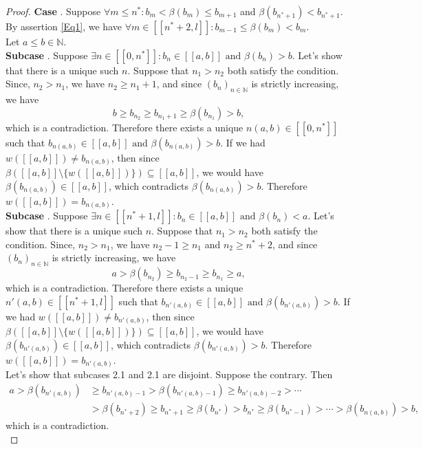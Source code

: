 \documentclass[a4paper,11pt]{article}
\newcommand*\circled[1]{\tikz[baseline=(char.base)]{
            \node[shape=circle,draw,inner sep=2pt] (char) {#1};}}
\theoremstyle{plain}
\theoremstyle{definition}
\theoremstyle{remark}
\begin{document}
\begin{proof}
\noindent \textbf{Case \circled{2}}.  Suppose $\forall m \leq n^* : b_m < \beta(b_m) \leq b_{m+1}$ and $\beta(b_{n^*+1}) < b_{n^*+1}$. By assertion \ref{Eq1}, we have $\forall m \in [\![n^*+2,l]\!] : b_{m-1} \leq \beta(b_m) < b_m$. \\
Let $a \leq b \in \mathbb{N}$. \\
\textbf{Subcase \circled{2.1}}. Suppose $\exists n \in [\![0,n^*]\!] : b_n \in [\![a,b]\!] \text{ and } \beta(b_n) > b$. Let's show that there is a unique such $n$. Suppose that $n_1 > n_2$ both satisfy the condition. Since, $n_2 > n_1$, we have $n_2 \geq n_1 + 1$, and since $(b_n)_{n \in \mathbb{N}}$ is strictly increasing, we have 
\[ b \geq b_{n_2} \geq b_{n_1 + 1} \geq \beta(b_{n_1}) > b, \]
which is a contradiction. Therefore there exists a unique $n(a,b) \in [\![0,n^*]\!]$ such that $b_{n(a,b)} \in [\![a,b]\!] \text{ and } \beta(b_{n(a,b)}) > b$. If we had $w([\![a,b]\!]) \neq b_{n(a,b)}$, then since $\beta([\![a,b]\!]\setminus \{w([\![a,b]\!])\}) \subseteq [\![a,b]\!]$, we would have $\beta(b_{n(a,b)}) \in [\![a,b]\!]$, which contradicts $\beta(b_{n(a,b)}) > b$. Therefore $w([\![a,b]\!]) = b_{n(a,b)}$. \\
\textbf{Subcase \circled{2.2}}. Suppose $\exists n \in [\![n^*+1,l]\!] : b_n \in [\![a,b]\!] \text{ and } \beta(b_n) < a $. Let's show that there is a unique such $n$. Suppose that $n_1 > n_2$ both satisfy the condition. Since, $n_2 > n_1$, we have $n_2 -  1 \geq n_1$ and $n_2 \geq n^*+2$, and since $(b_n)_{n \in \mathbb{N}}$ is strictly increasing, we have 
\[ a > \beta(b_{n_2}) \geq b_{n_2 - 1} \geq b_{n_1} \geq a, \]
which is a contradiction. Therefore there exists a unique $n'(a,b) \in [\![n^*+1,l]\!]$ such that $b_{n'(a,b)} \in [\![a,b]\!] \text{ and } \beta(b_{n'(a,b)}) > b$. If we had $w([\![a,b]\!]) \neq b_{n'(a,b)}$, then since $\beta([\![a,b]\!]\setminus \{w([\![a,b]\!])\}) \subseteq [\![a,b]\!]$, we would have $\beta(b_{n'(a,b)}) \in [\![a,b]\!]$, which contradicts $\beta(b_{n'(a,b)}) > b$. Therefore $w([\![a,b]\!]) = b_{n'(a,b)}$. \\
Let's show that subcases 2.1 and 2.1 are disjoint. Suppose the contrary. Then 
\begin{align*}
a > \beta(b_{n'(a,b)}) &\geq b_{n'(a,b)-1}  > \beta(b_{n'(a,b)-1}) \geq b_{n'(a,b)-2} > \cdots  \\
&> \beta(b_{n^*+2}) \geq b_{n^* + 1} \geq \beta(b_{n^*}) > b_{n^*} \geq \beta(b_{n^* - 1}) > \cdots > \beta(b_{n(a,b)}) > b, 
\end{align*}
which is a contradiction. \\

\end{proof}
\end{document}
